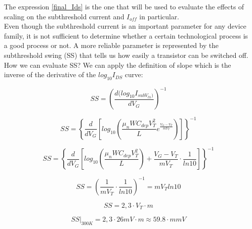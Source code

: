 \documentclass[a4paper, 12pt, twoside, openright]{report}
\begin{document}
The expression \ref{final_Ids} is the one that will be used to evaluate the effects of scaling on the subthreshold current and $I_{off}$ in particular. \\
Even though the subthreshold current is an important parameter for any device family, it is not sufficient to determine whether a certain technological process is a good process or not. A more reliable parameter is represented by the subthreshold swing (SS) that tells us how easily a transistor can be switched off. How we can evaluate SS? We can apply the definition of slope which is the inverse of the derivative of the $log_{10}I_{DS}$ curve:

	\begin{equation}
	SS = \left( \frac{d(log_{10}I_{subV_{th})}}{dV_G} \right)^{-1}
	\end{equation}
	
	\begin{equation}
	SS = \left \{ \frac{d}{dV_G} \left[ log_{10} \left( \frac{\mu_n W C_{dep} V_T^2}{L} e^{\frac{V_G - V_T}{m V_T}} \right) 	\right] \right \}^{-1}
	\end{equation}
	
	\begin{equation}
	SS = \left \{ \frac{d}{dV_G} \left[ log_{10} \left( \frac{\mu_n W C_{dep} V_T^2}{L} \right) + \frac{V_G - V_T}{m V_T} 		\cdot \frac{1}{ln10} \right] \right \}^{-1}
	\end{equation}
	
	\begin{equation}
	SS = \left( \frac{1}{m V_T} \cdot \frac{1}{ln10} \right)^{-1} = m V_T ln10
	\end{equation}
	
	\begin{equation}
	SS = 2,3 \cdot V_T \cdot m
	\end{equation}
	
	\begin{equation}
	SS|_{300K}  = 2,3 \cdot 26mV \cdot m \approx 59.8\cdot m mV
	\end{equation}
\end{document}
